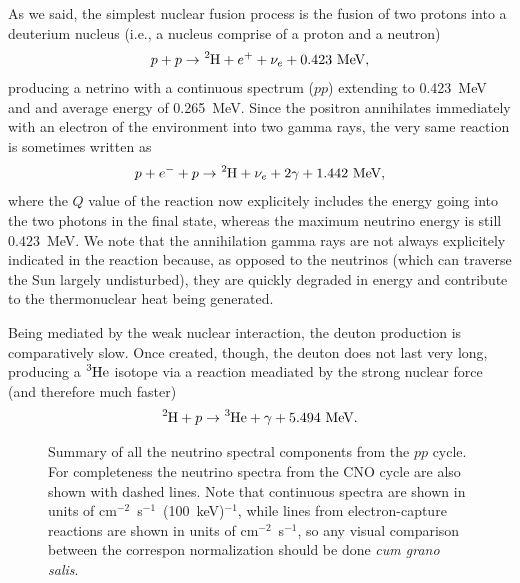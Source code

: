 As we said, the simplest nuclear fusion process is the fusion of two protons into a
deuterium nucleus (i.e., a nucleus comprise of a proton and a neutron)
\begin{align*}
  p + p \rightarrow \ce{^2H} + e^+ + \nu_e + 0.423~\text{MeV},
\end{align*}
producing a netrino with a continuous spectrum ($pp$) extending to 0.423~MeV and
and average energy of 0.265~MeV. Since the positron annihilates immediately with
an electron of the environment into two gamma rays, the very same reaction is
sometimes written as
\begin{align*}
  p + e^- + p \rightarrow \ce{^2H} + \nu_e + 2\gamma + 1.442~\text{MeV},
\end{align*}
where the $Q$ value of the reaction now explicitely includes the energy going into
the two photons in the final state, whereas the maximum neutrino energy is still
$0.423$~MeV.
We note that the annihilation gamma rays are not always explicitely indicated in
the reaction because, as opposed to the neutrinos (which can traverse the Sun largely
undisturbed), they are quickly degraded in energy and contribute to the thermonuclear
heat being generated.

Being mediated by the weak nuclear interaction, the deuton production is comparatively
slow. Once created, though, the deuton does not last very long, producing a $\ce{^3He}$
isotope via a reaction meadiated by the strong nuclear force (and therefore much faster)
\begin{align*}
  \ce{^2H} + p \rightarrow \ce{^3He} + \gamma + 5.494~\text{MeV}.
\end{align*}

\begin{figure}[!htbp]
  
  \caption{Summary of all the neutrino spectral components from the $pp$ cycle. For
  completeness the neutrino spectra from the CNO cycle are also shown with dashed
  lines. Note that continuous spectra are shown in units of cm$^{-2}$~s$^{-1}$~(100~keV)$^{-1}$,
  while lines from electron-capture reactions are shown in units of cm$^{-2}$~s$^{-1}$,
  so any visual comparison between the correspon normalization should be done
  \emph{cum grano salis}.}
  \label{fig:sun_neutrino_spectra}
\end{figure}

